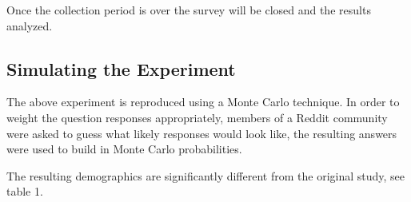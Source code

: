 Once the collection period is over the survey will be closed and the results analyzed.

\subsection{Simulating the Experiment}

The above experiment is reproduced using a Monte Carlo technique. In order to weight the question responses appropriately, members of a Reddit community were asked to guess what likely responses would look like, the resulting answers were used to build in Monte Carlo probabilities.

The resulting demographics are significantly different from the original study, see table 1.

\FloatBarrier
